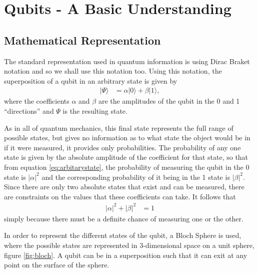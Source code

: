 
\section{Qubits - A Basic Understanding}
\subsection{Mathematical Representation}
The standard representation used in quantum information is using Dirac Braket notation and so we shall use this notation too. Using this notation, the superposition of a qubit in an arbitrary state is given by
\begin{align}
	|\Psi\rangle &= \alpha|0\rangle + \beta|1\rangle,\label{eq:arbitarystate}
\end{align}
where the coefficients $\alpha$ and $\beta$ are the amplitudes of the qubit in the 0 and 1 ``directions'' and $\Psi$ is the resulting state.

As in all of quantum mechanics, this final state represents the full range of possible states, but gives no information as to what state the object would be in if it were measured, it provides only probabilities. The probability of any one state is given by the absolute amplitude of the coefficient for that state, so that from equation \ref{eq:arbitarystate}, the probability of measuring the qubit in the 0 state is $|\alpha|^2$ and the corresponding probability of it being in the 1 state is $|\beta|^2$. Since there are only two absolute states that exist and can be measured, there are constraints on the values that these coefficients can take. It follows that 
\begin{align}
	|\alpha|^2 + |\beta|^2 &= 1 \label{eq:constraint}
\end{align}
simply because there must be a definite chance of measuring one or the other.

In order to represent the different states of the qubit, a Bloch Sphere is used, where the possible states are represented in 3-dimensional space on a unit sphere\cite{gentleintro}, figure \ref{fig:bloch}. A qubit can be in a superposition such that it can exit at any point on the surface of the sphere. 


